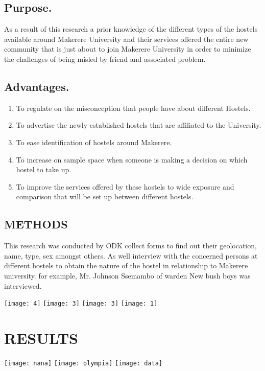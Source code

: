 \documentclass{article}
\begin{document}
\subsection{Purpose.}\label{sec:into}

As a result of this research a prior knowledge of the different types of the hostels available around Makerere University and   their services offered the entire new community that is just about to join Makerere University in order to minimize the challenges of being misled by friend and associated problem. 




\subsection{Advantages.}\label{sec:into}
\begin{enumerate}
	\item  To regulate on the misconception that people have about different Hostels.
	\item   To advertise the newly established hostels that are affiliated to the University. 
	\item  To ease identification of hostels around Makerere.
	\item    To increase on sample space when someone is making a decision on which hostel to take up.
	\item   To improve the services offered by these hostels to wide exposure and comparison that will be set up   between different hostels.
\end{enumerate}

	


\subsection{METHODS}\label{sec:into}
This research was conducted by ODK collect forms to find out their geolocation, name, type, sex amongst others.
As well interview with the concerned persons at different hostels to obtain the nature of the hostel in relationship to Makerere university. for example, Mr. Johnson Ssemambo of warden New bush boys was interviewed.
    
\texttt{[image: 4]}  \texttt{[image: 3]}    \texttt{[image: 3]}   \texttt{[image: 1]}


\section{RESULTS}\label{sec:into}
		\texttt{[image: nana]}     \texttt{[image: olympia]} 
\texttt{[image: data]}
\end{document}

